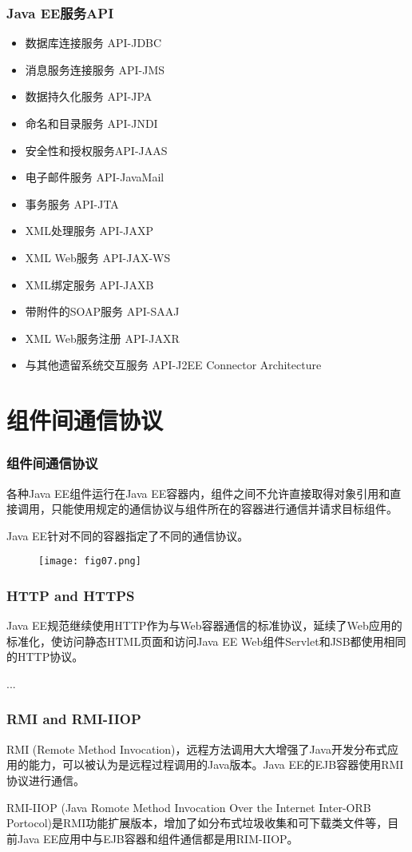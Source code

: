 \begin{frame}
\frametitle{Java EE服务API} 

\begin{itemize}
\item 数据库连接服务 API-JDBC
\item 消息服务连接服务 API-JMS
\item 数据持久化服务 API-JPA
\item 命名和目录服务 API-JNDI
\item 安全性和授权服务API-JAAS
\item 电子邮件服务 API-JavaMail
\item 事务服务 API-JTA
\item XML处理服务 API-JAXP
\item XML Web服务 API-JAX-WS
\item XML绑定服务 API-JAXB
\item 带附件的SOAP服务 API-SAAJ
\item XML Web服务注册 API-JAXR
\item 与其他遗留系统交互服务 API-J2EE Connector Architecture
\end{itemize}
\end{frame}

\section{组件间通信协议}
\begin{frame}
\frametitle{组件间通信协议} 

{\hei 各种Java EE组件运行在Java EE容器内，组件之间不允许直接取得对象引用和直接调用，只能使用规定的通信协议与组件所在的容器进行通信并请求目标组件。}

Java EE针对不同的容器指定了不同的通信协议。

\begin{figure}
\centering
\texttt{[image: fig07.png]}
\end{figure} 
\end{frame}

\begin{frame}
\frametitle{HTTP and HTTPS} 
\kai
{} 

Java EE规范继续使用HTTP作为与Web容器通信的标准协议，延续了Web应用的标准化，使访问静态HTML页面和访问Java EE Web组件Servlet和JSB都使用相同的HTTP协议。


... 
\end{frame}

\begin{frame}
\frametitle{RMI and RMI-IIOP} 
\kai
{}

RMI (Remote Method Invocation)，远程方法调用大大增强了Java开发分布式应用的能力，可以被认为是远程过程调用的Java版本。Java EE的EJB容器使用RMI协议进行通信。


RMI-IIOP (Java Romote Method Invocation Over the Internet Inter-ORB Portocol)是RMI功能扩展版本，增加了如分布式垃圾收集和可下载类文件等，目前Java EE应用中与EJB容器和组件通信都是用RIM-IIOP。
\end{frame}

